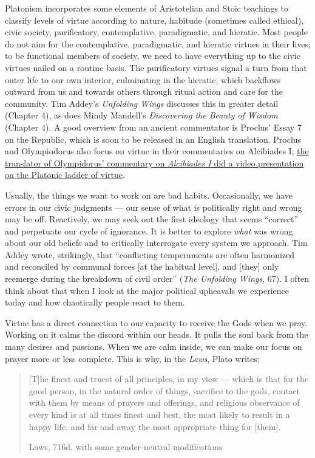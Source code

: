 \documentclass[
]{book}
\begin{document}
Platonism incorporates some elements of Aristotelian and Stoic teachings to classify levels of virtue according to nature, habitude (sometimes called ethical), civic society, purificatory, contemplative, paradigmatic, and hieratic. Most people do not aim for the contemplative, paradigmatic, and hieratic virtues in their lives; to be functional members of society, we need to have everything up to the civic virtues nailed on a routine basis. The purificatory virtues signal a turn from that outer life to our own interior, culminating in the hieratic, which backflows outward from us and towards others through ritual action and care for the community. Tim Addey's \emph{Unfolding Wings} discusses this in greater detail (Chapter 4), as does Mindy Mandell's \emph{Discovering the Beauty of Wisdom} (Chapter 4). A good overview from an ancient commentator is Proclus' Essay 7 on the Republic, which is soon to be released in an English translation. Proclus and Olympiodorus also focus on virtue in their commentaries on Alcibiades I; \href{https://www.academia.edu/44622434/The_Neoplatonic_Scale_of_Virtues_in_Olympiodorus_Body_and_Soul}{the translator of Olympidorus' commentary on \emph{Alcibiades I} did a video presentation on the Platonic ladder of virtue}.

Usually, the things we want to work on are bad habits. Occasionally, we have errors in our civic judgments --- our sense of what is politically right and wrong may be off. Reactively, we may seek out the first ideology that seems ``correct'' and perpetuate our cycle of ignorance. It is better to explore \emph{what} was wrong about our old beliefs and to critically interrogate every system we approach. Tim Addey wrote, strikingly, that ``conflicting temperaments are often harmonized and reconciled by communal forces {[}at the habitual level{]}, and {[}they{]} only reemerge during the breakdown of civil order'' (\emph{The Unfolding Wings}, 67). I often think about that when I look at the major political upheavals we experience today and how chaotically people react to them.

Virtue has a direct connection to our capacity to receive the Gods when we pray. Working on it calms the discord within our heads. It pulls the soul back from the many desires and passions. When we are calm inside, we can make our focus on prayer more or less complete. This is why, in the \emph{Laws}, Plato writes:

\begin{quote}
{[}T{]}he finest and truest of all principles, in my view --- which is that for the good person, in the natural order of things, sacrifice to the gods, contact with them by means of prayers and offerings, and religious observance of every kind is at all times finest and best, the most likely to result in a happy life, and far and away the most appropriate thing for {[}them{]}.

Laws, 716d, with some gender-neutral modifications
\end{quote}
\end{document}
